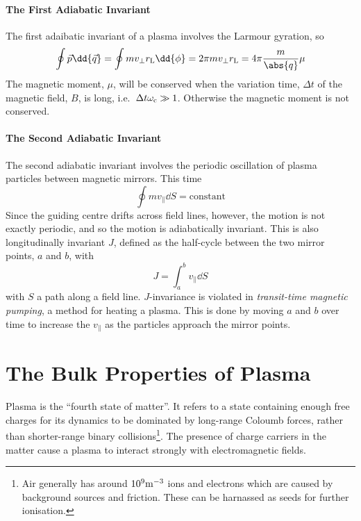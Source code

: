 \documentclass{book}         		                %
\begin{document}
\subsubsection{The First Adiabatic Invariant}
\label{sec:first-adiab-invar}

The first adaibatic invariant of a plasma involves the Larmour gyration, so
\begin{equation}
  \label{eq:7}
  \oint \vec{p} \dd{\vec{q}} = \oint m v_{\perp} r_{\rm L} \dd{\phi} = 2 \pi m v_{\perp} r_{\rm L} = 4 \pi \frac{m}{\abs{q}} \mu 
\end{equation}
The magnetic moment, $\mu$, will be conserved when the variation time,
$\Delta t$ of the magnetic field, $B$, is long, i.e.\ $\Delta t
\omega_{\rm c} \gg 1$. Otherwise the magnetic moment is not conserved.

\subsubsection{The Second Adiabatic Invariant}
\label{sec:second-adiab-invar}

The second adiabatic invariant involves the periodic oscillation of
plasma particles between magnetic mirrors. This time
\begin{equation}
  \label{eq:8}
  \oint m v_{\parallel} \dd{S} = \text{constant}
\end{equation}
Since the guiding centre drifts across field lines, however, the
motion is not exactly periodic, and so the motion is adiabatically
invariant. This is also longitudinally invariant $J$, defined as the
half-cycle between the two mirror points, $a$ and $b$, with
\[ J= \int_a^b v_{\parallel} \dd{S} \] with $S$ a path along a field
line.  $J$-invariance is violated in \emph{transit-time magnetic
  pumping}, a method for heating a plasma. This is done by moving $a$
and $b$ over time to increase the $v_{\parallel}$ as the particles
approach the mirror points.

\chapter{The Bulk Properties of Plasma}
\label{cha:bulk-prop-plasma}

Plasma is the ``fourth state of matter''. It refers to a state
containing enough free charges for its dynamics to be dominated by
long-range Coloumb forces, rather than shorter-range binary
collisions\footnote{Air generally has around $10^{9} {\rm m}^{-3}$
  ions and electrons which are caused by background sources and
  friction. These can be harnassed as seeds for further ionisation.}.
The presence of charge carriers in the matter cause a plasma to
interact strongly with electromagnetic fields.
\end{document}
